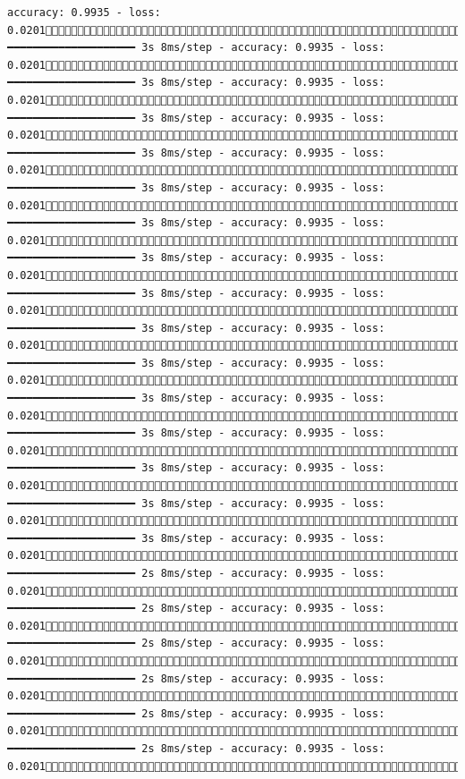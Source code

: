 \documentclass[
  letterpaper,
  DIV=11,
  numbers=noendperiod]{scrreprt}
\begin{document}
\begin{verbatim}
accuracy: 0.9935 - loss: 0.02011379/1875 ━━━━━━━━━━━━━━━━━━━━ 3s 8ms/step - accuracy: 0.9935 - loss: 0.02011386/1875 ━━━━━━━━━━━━━━━━━━━━ 3s 8ms/step - accuracy: 0.9935 - loss: 0.02011394/1875 ━━━━━━━━━━━━━━━━━━━━ 3s 8ms/step - accuracy: 0.9935 - loss: 0.02011401/1875 ━━━━━━━━━━━━━━━━━━━━ 3s 8ms/step - accuracy: 0.9935 - loss: 0.02011409/1875 ━━━━━━━━━━━━━━━━━━━━ 3s 8ms/step - accuracy: 0.9935 - loss: 0.02011417/1875 ━━━━━━━━━━━━━━━━━━━━ 3s 8ms/step - accuracy: 0.9935 - loss: 0.02011424/1875 ━━━━━━━━━━━━━━━━━━━━ 3s 8ms/step - accuracy: 0.9935 - loss: 0.02011431/1875 ━━━━━━━━━━━━━━━━━━━━ 3s 8ms/step - accuracy: 0.9935 - loss: 0.02011438/1875 ━━━━━━━━━━━━━━━━━━━━ 3s 8ms/step - accuracy: 0.9935 - loss: 0.02011446/1875 ━━━━━━━━━━━━━━━━━━━━ 3s 8ms/step - accuracy: 0.9935 - loss: 0.02011453/1875 ━━━━━━━━━━━━━━━━━━━━ 3s 8ms/step - accuracy: 0.9935 - loss: 0.02011460/1875 ━━━━━━━━━━━━━━━━━━━━ 3s 8ms/step - accuracy: 0.9935 - loss: 0.02011468/1875 ━━━━━━━━━━━━━━━━━━━━ 3s 8ms/step - accuracy: 0.9935 - loss: 0.02011474/1875 ━━━━━━━━━━━━━━━━━━━━ 3s 8ms/step - accuracy: 0.9935 - loss: 0.02011481/1875 ━━━━━━━━━━━━━━━━━━━━ 3s 8ms/step - accuracy: 0.9935 - loss: 0.02011488/1875 ━━━━━━━━━━━━━━━━━━━━ 2s 8ms/step - accuracy: 0.9935 - loss: 0.02011496/1875 ━━━━━━━━━━━━━━━━━━━━ 2s 8ms/step - accuracy: 0.9935 - loss: 0.02011503/1875 ━━━━━━━━━━━━━━━━━━━━ 2s 8ms/step - accuracy: 0.9935 - loss: 0.02011510/1875 ━━━━━━━━━━━━━━━━━━━━ 2s 8ms/step - accuracy: 0.9935 - loss: 0.02011517/1875 ━━━━━━━━━━━━━━━━━━━━ 2s 8ms/step - accuracy: 0.9935 - loss: 0.02011525/1875 ━━━━━━━━━━━━━━━━━━━━ 2s 8ms/step - accuracy: 0.9935 - loss: 0.02011533/1875 
\end{verbatim}
\end{document}

